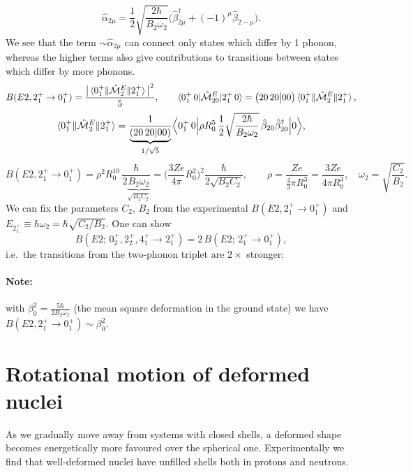 \documentclass[11pt,a4paper]{article}
\newcommand{\op}[1]{\hat{#1}}
\begin{document}
\[
\op\alpha_{2\mu}=\frac12\sqrt{\frac{2\hbar}{B_2\omega_2}}\Big(\op\beta^\dagger_{2\mu}+(-1)^\mu\op\beta_{2-\mu}\Big).
\]
We see that the term $\sim\op\alpha_{2\mu}$ can connect only states which differ by 1 phonon, whereas the higher terms also give contributions to transitions between states which differ by more phonons.
\[
B(E2,2^+_1\to0^+_1)=\frac{\big|\braket{0^+_1\|\op{\mathcal M}^E_2\|2^+_1}\big|^2}{5},
\qquad
\braket{0^+_1\,0|\op{\mathcal M}^E_{20}|2^+_1\,0}=\big(20\,20\big|00\big)\braket{0^+_1\|\op{\mathcal M}^E_2\|2^+_1},
\]
\[
\braket{0^+_1\|\op{\mathcal M}^E_2\|2^+_1}=\frac{1}{\underbrace{(20\,20|00)}_{1/\sqrt5}}\Big\langle0^+_1\,0\Big|\rho R_0^5\,\frac12\sqrt{\frac{2\hbar}{B_2\omega_2}}\,\op\beta_{20}\op\beta^\dagger_{20}\Big|0\Big\rangle ,
\]
\[
B(E2,2^+_1\to0^+_1)=\rho^2R_0^{10}\,\frac{\hbar}{2\underbrace{B_2\omega_2}_{\sqrt{B_2C_2}}}
=\Big(\frac{3Ze}{4\pi}R_0^2\Big)^2\frac{\hbar}{2\sqrt{B_2C_2}},
\qquad \rho=\frac{Ze}{\frac43\pi R_0^3}=\frac{3Ze}{4\pi R_0^3},\quad \omega_2=\sqrt{\frac{C_2}{B_2}} .
\]
We can fix the parameters $C_2$, $B_2$ from the experimental $B(E2,2^+_1\to0^+_1)$ and $E_{2^+_1}\equiv\hbar\omega_2=\hbar\sqrt{C_2/B_2}$.
One can show
\[
\boxed{B(E2;\,0^+_2,2^+_2,4^+_1\to2^+_1)=2\,B(E2;\,2^+_1\to0^+_1)},
\]
i.e.\ the transitions from the two-phonon triplet are $2\times$ stronger:
\begin{center}
\end{center}
\paragraph{Note:} with $\beta_0^2=\frac{5\hbar}{2B_2\omega_2}$ (the mean square deformation in the ground state) we have $B(E2,2^+_1\to0^+_1)\sim\beta_0^2$.

\section{Rotational motion of deformed nuclei}
As we gradually move away from systems with closed shells, a deformed shape becomes energetically more favoured over the spherical one. Experimentally we find that well-deformed nuclei have unfilled shells both in protons and neutrons.
\end{document}

